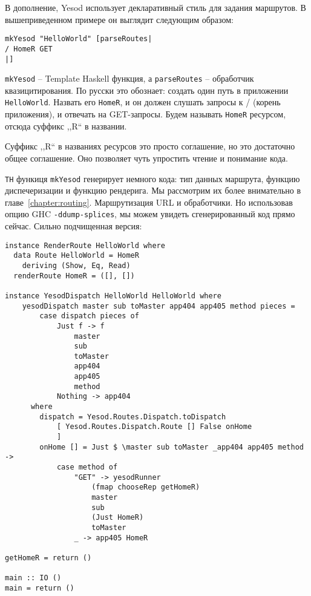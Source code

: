 В дополнение, Yesod использует декларативный стиль для задания маршрутов. 
В вышеприведенном примере он выглядит следующим образом:

\begin{lstlisting}
mkYesod "HelloWorld" [parseRoutes|
/ HomeR GET
|]
\end{lstlisting}

\lstinline!mkYesod! -- Template Haskell функция, а \lstinline!parseRoutes! -- 
обработчик квазицитирования. По русски это обознает: создать один 
путь в приложении \texttt{HelloWorld}. Назвать его \lstinline!HomeR!, и он 
должен слушать запросы к / (корень приложения), и отвечать на GET-запросы.
Будем называть \lstinline!HomeR! ресурсом, отсюда суффикс ,,R`` в названии.

Суффикс ,,R`` в названиях ресурсов это просто соглашение, 
но это достаточно общее соглашение. Оно позволяет чуть упростить чтение и 
понимание кода.

\texttt{TH} функиця \lstinline!mkYesod! генерирует немного кода: 
тип данных маршрута, функцию диспечеризации и функцию рендерига. 
Мы рассмотрим их более внимательно в главе~\ref{chapter:routing}. 
Маршрутизация URL и обработчики.
Но использовав опцию GHC \lstinline'-ddump-splices', мы можем увидеть 
сгенерированный код прямо сейчас. Сильно подчищенная версия: 

\begin{lstlisting}
instance RenderRoute HelloWorld where
  data Route HelloWorld = HomeR
    deriving (Show, Eq, Read)
  renderRoute HomeR = ([], [])

instance YesodDispatch HelloWorld HelloWorld where
    yesodDispatch master sub toMaster app404 app405 method pieces =
        case dispatch pieces of
            Just f -> f
                master
                sub
                toMaster
                app404
                app405
                method
            Nothing -> app404
      where
        dispatch = Yesod.Routes.Dispatch.toDispatch
            [ Yesod.Routes.Dispatch.Route [] False onHome
            ]
        onHome [] = Just $ \master sub toMaster _app404 app405 method ->
            case method of
                "GET" -> yesodRunner
                    (fmap chooseRep getHomeR)
                    master
                    sub
                    (Just HomeR)
                    toMaster
                _ -> app405 HomeR

getHomeR = return ()

main :: IO ()
main = return ()
\end{lstlisting}

